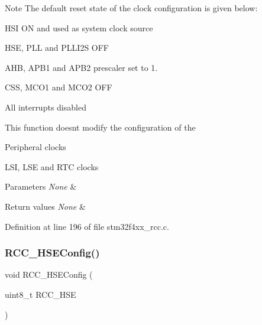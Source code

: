 \begin{DoxyNote}{Note}
The default reset state of the clock configuration is given below\+:
\begin{DoxyItemize}
\item H\+SI ON and used as system clock source
\item H\+SE, P\+LL and P\+L\+L\+I2S O\+FF
\item A\+HB, A\+P\+B1 and A\+P\+B2 prescaler set to 1.
\item C\+SS, M\+C\+O1 and M\+C\+O2 O\+FF
\item All interrupts disabled 
\end{DoxyItemize}

This function doesn\textquotesingle{}t modify the configuration of the
\begin{DoxyItemize}
\item Peripheral clocks
\item L\+SI, L\+SE and R\+TC clocks 
\end{DoxyItemize}
\end{DoxyNote}

\begin{DoxyParams}{Parameters}
{\em None} & \\
\hline
\end{DoxyParams}

\begin{DoxyRetVals}{Return values}
{\em None} & \\
\hline
\end{DoxyRetVals}


Definition at line 196 of file stm32f4xx\+\_\+rcc.\+c.

\mbox{\label{group___r_c_c___group1_ga523b06e73f6aa8a03e42299c855066a8}} 
\subsubsection{\texorpdfstring{R\+C\+C\+\_\+\+H\+S\+E\+Config()}{RCC\_HSEConfig()}}
{\footnotesize\ttfamily void R\+C\+C\+\_\+\+H\+S\+E\+Config (\begin{DoxyParamCaption}\item[{uint8\+\_\+t}]{R\+C\+C\+\_\+\+H\+SE }\end{DoxyParamCaption})}



